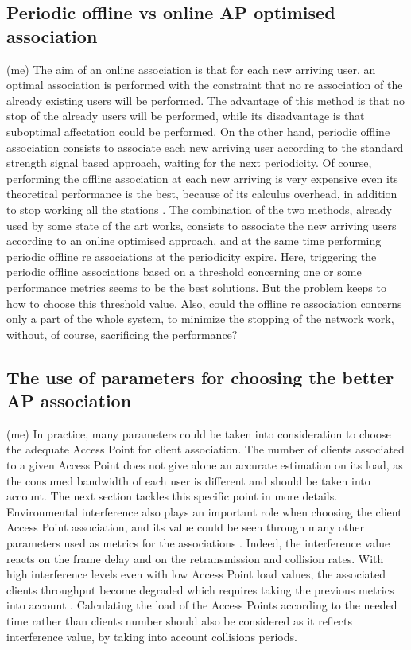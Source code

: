 \documentclass[journal,transmag]{IEEEtran}
\begin{document}
\subsection{Periodic offline vs online AP optimised association} (me)
The aim of an online association is that for each new arriving user, an optimal association is performed with the constraint that no re association of the already existing users will be performed\cite{08AP_assignement_algorithms}. The advantage of this method is that no stop of the already users will be performed, while its disadvantage is that suboptimal affectation could be performed. On the other hand, periodic offline association consists to associate each new arriving user according to the standard strength signal based approach, waiting for the next periodicity. Of course, performing the offline association at each new arriving is very expensive even its theoretical performance is the best, because of its calculus overhead, in addition to stop working all the stations \cite{04Fairness_load_balancing_WLAN}. The combination of the two methods, already used by some state of the art works, consists to associate the new arriving users according to an online optimised approach, and at the same time performing periodic offline re associations at the periodicity expire\cite{14throughput_optimisation_AP_association_interefrence,08proportional_fairness_multiRate_LAN, 07fairness_load_balancing_LAN}. Here, triggering the periodic offline associations based on a threshold concerning one or some performance metrics seems to be the best solutions. But the problem keeps to how to choose this threshold value. Also, could the offline re association concerns only a part of the whole system, to minimize the stopping of the network work, without, of course, sacrificing the performance?     

\subsection{The use of parameters for choosing the better AP association} (me)
In practice, many parameters could be taken into consideration to choose the adequate Access Point for client association. The number of clients associated to a given Access Point does not give alone an accurate estimation on its load, as the consumed bandwidth of each user is different and should be taken into account. The next section tackles this specific point in more details. Environmental interference also plays an important role when choosing the client Access Point association, and its value could be seen through many other parameters used as metrics for the associations \cite{08Design_high_wifi_entreprise}. Indeed, the interference value reacts on the frame delay and on the retransmission and collision rates. With high interference levels even with low Access Point load values, the associated clients throughput become degraded which requires taking the previous metrics into account \cite{15dynamic_AP_association_SDN}. Calculating the load of the Access Points according to the needed time rather than clients number should also be considered as it reflects interference value, by taking into account collisions periods.      
\end{document}
